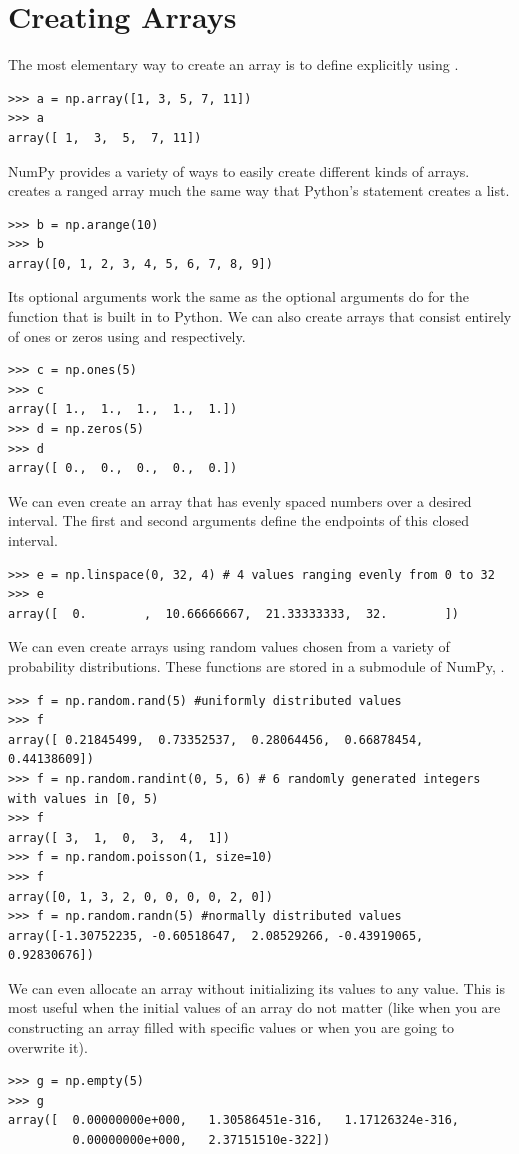 \section*{Creating Arrays}
The most elementary way to create an array is to define explicitly using .
\begin{lstlisting}
>>> a = np.array([1, 3, 5, 7, 11])
>>> a
array([ 1,  3,  5,  7, 11])
\end{lstlisting}
NumPy provides a variety of ways to easily create different kinds of arrays.
 creates a ranged array much the same way that Python's  statement creates a list.
\begin{lstlisting}
>>> b = np.arange(10)
>>> b
array([0, 1, 2, 3, 4, 5, 6, 7, 8, 9])
\end{lstlisting}
Its optional arguments work the same as the optional arguments do for the  function that is built in to Python.
We can also create arrays that consist entirely of ones or zeros using  and  respectively.
\begin{lstlisting}
>>> c = np.ones(5)
>>> c
array([ 1.,  1.,  1.,  1.,  1.])
>>> d = np.zeros(5)
>>> d
array([ 0.,  0.,  0.,  0.,  0.])
\end{lstlisting}
We can even create an array that has evenly spaced numbers over a desired interval.
The first and second arguments define the endpoints of this closed interval.
\begin{lstlisting}
>>> e = np.linspace(0, 32, 4) # 4 values ranging evenly from 0 to 32
>>> e
array([  0.        ,  10.66666667,  21.33333333,  32.        ])
\end{lstlisting}
We can even create arrays using random values chosen from a variety of probability distributions.
These functions are stored in a submodule of NumPy, .
\begin{lstlisting}
>>> f = np.random.rand(5) #uniformly distributed values
>>> f
array([ 0.21845499,  0.73352537,  0.28064456,  0.66878454,  0.44138609])
>>> f = np.random.randint(0, 5, 6) # 6 randomly generated integers with values in [0, 5)
>>> f
array([ 3,  1,  0,  3,  4,  1])
>>> f = np.random.poisson(1, size=10)
>>> f
array([0, 1, 3, 2, 0, 0, 0, 0, 2, 0])
>>> f = np.random.randn(5) #normally distributed values
array([-1.30752235, -0.60518647,  2.08529266, -0.43919065,  0.92830676])
\end{lstlisting}
We can even allocate an array without initializing its values to any value.
This is most useful when the initial values of an array do not matter (like when you are constructing an array filled with specific values or when you are going to overwrite it).
\begin{lstlisting}
>>> g = np.empty(5)
>>> g
array([  0.00000000e+000,   1.30586451e-316,   1.17126324e-316,
         0.00000000e+000,   2.37151510e-322])
\end{lstlisting}

